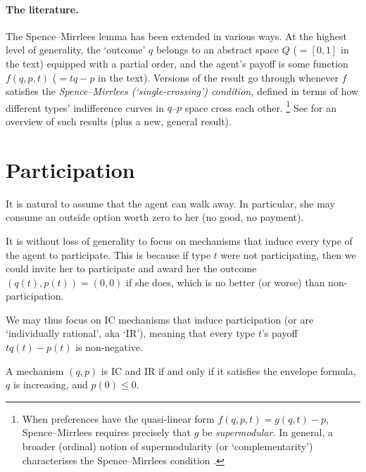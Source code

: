 \paragraph{The literature.}
The Spence--Mirrlees lemma has been extended in various ways.
At the highest level of generality, the `outcome' $q$ belongs to an abstract space $Q$ ($=[0,1]$ in the text) equipped with a partial order,
and the agent's payoff is some function $f(q,p,t)$ ($=tq-p$ in the text).
Versions of the result go through whenever $f$ satisfies the \emph{Spence--Mirrlees (`single-crossing') condition,}
defined in terms of how different types' indifference curves in $q$--$p$ space cross each other.%
	\footnote{When preferences have the quasi-linear form $f(q,p,t) = g(q,t) - p$, Spence--Mirrlees requires precisely that $g$ be \emph{supermodular.}
	In general, a broader (ordinal) notion of supermodularity (or `complementarity') characterises the Spence--Mirrlees condition \parencite[][Theorem 3]{MilgromShannon1994}.}
See \textcite[§4]{Sinander2022} for an overview of such results (plus a new, general result).



\section{Participation}
\label{sec:ch1:part}

It is natural to assume that the agent can walk away.
In particular, she may consume an outside option worth zero to her (no good, no payment).

It is without loss of generality to focus on mechanisms that induce every type of the agent to participate.
This is because if type $t$ were not participating, then we could invite her to participate and award her the outcome $(q(t),p(t)) = (0,0)$ if she does, which is no better (or worse) than non-participation.

We may thus focus on IC mechanisms that induce participation (or are `individually rational', aka `IR'),
meaning that every type $t$'s payoff $t q(t) - p(t)$ is non-negative.

\begin{corollary}
	\label{corollary:ic_ir}
	A mechanism $(q,p)$ is IC and IR if and only if
	it satisfies the envelope formula,
	$q$ is increasing,
	and $p(0) \leq 0$.
\end{corollary}


